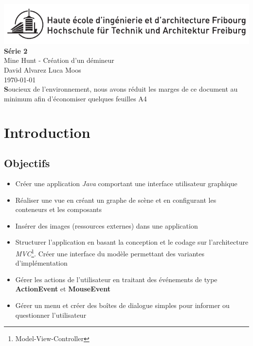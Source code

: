 \documentclass[a4paper, 10pt]{article}
\begin{document}
\begin{titlepage}
\thispagestyle{fancy} %
\begin{center}
\includegraphics[width=\textwidth]{./logonb.pdf}\\
\vspace{2.5cm}
{\Huge \textbf{Série 2}}\\%
\vspace{0.2cm}
{\huge Mine Hunt - Création d'un démineur}\\%
\vspace{0.9cm}
{\LARGE David Alvarez \hspace{2cm}Luca Moos}\\%
\vspace{0.9cm}
{\Large \today}\\
\vspace{2 cm}
{\small \textbf Soucieux de l'environnement, nous avons réduit les marges de ce document au minimum afin d'économiser quelques feuilles A4}
\end{center}
\vfill
\tableofcontents
\end{titlepage}
\newpage
\section{Introduction}
\subsection{Objectifs}
\begin{itemize}
\item Créer une application \emph{Java} comportant une interface utilisateur graphique
\item Réaliser une vue en créant un graphe de scène et en configurant les conteneurs et les composants
\item Insérer des images (ressources externes) dans une application
\item Structurer l'application en basant la conception et le codage sur l'architecture \emph{MVC}\footnote{Model-View-Controller}. Créer une interface du modèle permettant des variantes d'implémentation
\item Gérer les actions de l'utilisateur en traitant des événements de type \textbf{ActionEvent} et \textbf{MouseEvent}
\item Gérer un menu et créer des boîtes de dialogue simples pour informer ou questionner l'utilisateur
\end{itemize}
\end{document}
